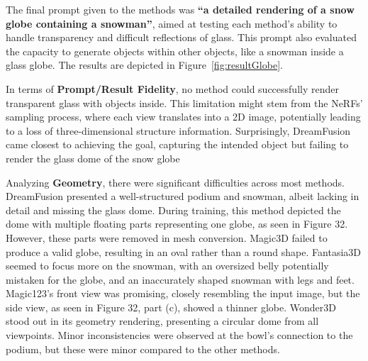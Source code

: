 The final prompt given to the methods was \textbf{``a detailed rendering of a snow globe containing a snowman''}, aimed at testing each method's ability to handle transparency and difficult reflections of glass. This prompt also evaluated the capacity to generate objects within other objects, like a snowman inside a glass globe. The results are depicted in Figure~\ref{fig:resultGlobe}.

In terms of \textbf{Prompt/Result Fidelity}, no method could successfully render transparent glass with objects inside. This limitation might stem from the NeRFs' sampling process, where each view translates into a 2D image, potentially leading to a loss of three-dimensional structure information. Surprisingly, DreamFusion came closest to achieving the goal, capturing the intended object but failing to render the glass dome of the snow globe

Analyzing \textbf{Geometry}, there were significant difficulties across most methods.  DreamFusion presented a well-structured podium and snowman, albeit lacking in detail and missing the glass dome. During training, this method depicted the dome with multiple floating parts representing one globe, as seen in Figure 32. However, these parts were removed in mesh conversion. Magic3D failed to produce a valid globe, resulting in an oval rather than a round shape. Fantasia3D seemed to focus more on the snowman, with an oversized belly potentially mistaken for the globe, and an inaccurately shaped snowman with legs and feet. Magic123's front view was promising, closely resembling the input image, but the side view, as seen in Figure 32, part (c), showed a thinner globe. Wonder3D stood out in its geometry rendering, presenting a circular dome from all viewpoints. Minor inconsistencies were observed at the bowl's connection to the podium, but these were minor compared to the other methods.

